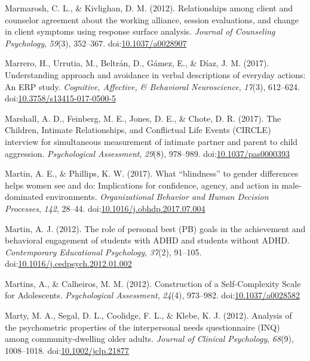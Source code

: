 \documentclass[english,man]{apa6}
\begin{document}
\hypertarget{ref-Marmarosh2012}{}
Marmarosh, C. L., \& Kivlighan, D. M. (2012). Relationships among client
and counselor agreement about the working alliance, session evaluations,
and change in client symptoms using response surface analysis.
\emph{Journal of Counseling Psychology}, \emph{59}(3), 352--367.
doi:\href{https://doi.org/10.1037/a0028907}{10.1037/a0028907}

\hypertarget{ref-Marrero2017}{}
Marrero, H., Urrutia, M., Beltrán, D., Gámez, E., \& Díaz, J. M. (2017).
Understanding approach and avoidance in verbal descriptions of everyday
actions: An ERP study. \emph{Cognitive, Affective, \& Behavioral
Neuroscience}, \emph{17}(3), 612--624.
doi:\href{https://doi.org/10.3758/s13415-017-0500-5}{10.3758/s13415-017-0500-5}

\hypertarget{ref-Marshall2017}{}
Marshall, A. D., Feinberg, M. E., Jones, D. E., \& Chote, D. R. (2017).
The Children, Intimate Relationships, and Conflictual Life Events
(CIRCLE) interview for simultaneous measurement of intimate partner and
parent to child aggression. \emph{Psychological Assessment},
\emph{29}(8), 978--989.
doi:\href{https://doi.org/10.1037/pas0000393}{10.1037/pas0000393}

\hypertarget{ref-Martin2017}{}
Martin, A. E., \& Phillips, K. W. (2017). What ``blindness'' to gender
differences helps women see and do: Implications for confidence, agency,
and action in male-dominated environments. \emph{Organizational Behavior
and Human Decision Processes}, \emph{142}, 28--44.
doi:\href{https://doi.org/10.1016/j.obhdp.2017.07.004}{10.1016/j.obhdp.2017.07.004}

\hypertarget{ref-Martin2012}{}
Martin, A. J. (2012). The role of personal best (PB) goals in the
achievement and behavioral engagement of students with ADHD and students
without ADHD. \emph{Contemporary Educational Psychology}, \emph{37}(2),
91--105.
doi:\href{https://doi.org/10.1016/j.cedpsych.2012.01.002}{10.1016/j.cedpsych.2012.01.002}

\hypertarget{ref-Martins2012}{}
Martins, A., \& Calheiros, M. M. (2012). Construction of a
Self-Complexity Scale for Adolescents. \emph{Psychological Assessment},
\emph{24}(4), 973--982.
doi:\href{https://doi.org/10.1037/a0028582}{10.1037/a0028582}

\hypertarget{ref-Marty2012}{}
Marty, M. A., Segal, D. L., Coolidge, F. L., \& Klebe, K. J. (2012).
Analysis of the psychometric properties of the interpersonal needs
questionnaire (INQ) among community-dwelling older adults. \emph{Journal
of Clinical Psychology}, \emph{68}(9), 1008--1018.
doi:\href{https://doi.org/10.1002/jclp.21877}{10.1002/jclp.21877}
\end{document}
